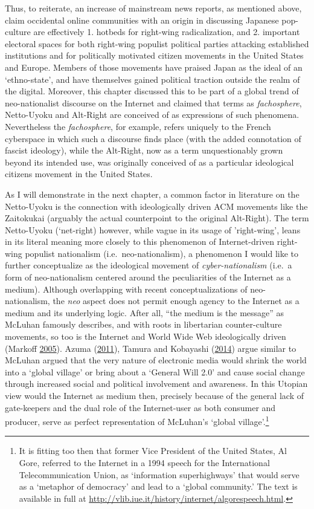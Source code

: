 \documentclass[10pt,british,A4paper,,openany]{memoir}
\begin{document}
Thus, to reiterate, an increase of mainstream news reports, as mentioned
above, claim occidental online communities with an origin in discussing
Japanese pop-culture are effectively 1. hotbeds for right-wing
radicalization, and 2. important electoral spaces for both right-wing
populist political parties attacking established institutions and for
politically motivated citizen movements in the United States and Europe.
Members of those movements have praised Japan as the ideal of an
`ethno-state', and have themselves gained political traction outside the
realm of the digital. Moreover, this chapter discussed this to be part
of a global trend of neo-nationalist discourse on the Internet and
claimed that terms as \emph{fachosphere}, Netto-Uyoku and Alt-Right are
conceived of as expressions of such phenomena. Nevertheless the
\emph{fachosphere}, for example, refers uniquely to the French
cyberspace in which such a discourse finds place (with the added
connotation of fascist ideology), while the Alt-Right, now as a term
unquestionably grown beyond its intended use, was originally conceived
of as a particular ideological citizens movement in the United States.

As I will demonstrate in the next chapter, a common factor in literature
on the Netto-Uyoku is the connection with ideologically driven ACM
movements like the Zaitokukai (arguably the actual counterpoint to the
original Alt-Right). The term Netto-Uyoku (`net-right) however, while
vague in its usage of 'right-wing', leans in its literal meaning more
closely to this phenomenon of Internet-driven right-wing populist
nationalism (i.e.~neo-nationalism), a phenomenon I would like to further
conceptualize as the ideological movement of \emph{cyber-nationalism}
(i.e.~a form of neo-nationalism centered around the peculiarities of the
Internet as a medium). Although overlapping with recent
conceptualizations of neo-nationalism, the \emph{neo} aspect does not
permit enough agency to the Internet as a medium and its underlying
logic. After all, ``the medium is the message'' as McLuhan famously
describes, and with roots in libertarian counter-culture movements, so
too is the Internet and World Wide Web ideologically driven (Markoff
\protect\hyperlink{ref-markoff_what_2005}{2005}). Azuma
(\protect\hyperlink{ref-azuma_ippan_2011}{2011}), Tamura and Kobayashi
(\protect\hyperlink{ref-tamura_niggling_2014}{2014}) argue similar to
McLuhan argued that the very nature of electronic media would shrink the
world into a `global village' or bring about a `General Will 2.0' and
cause social change through increased social and political involvement
and awareness. In this Utopian view would the Internet as medium then,
precisely because of the general lack of gate-keepers and the dual role
of the Internet-user as both consumer and producer, serve as perfect
representation of McLuhan's `global village'.\footnote{It is fitting too
  then that former Vice President of the United States, Al Gore,
  referred to the Internet in a 1994 speech for the International
  Telecommunication Union, as `information superhighways' that would
  serve as a `metaphor of democracy' and lead to a `global community.'
  The text is available in full at
  \url{http://vlib.iue.it/history/internet/algorespeech.html}.}
\end{document}
